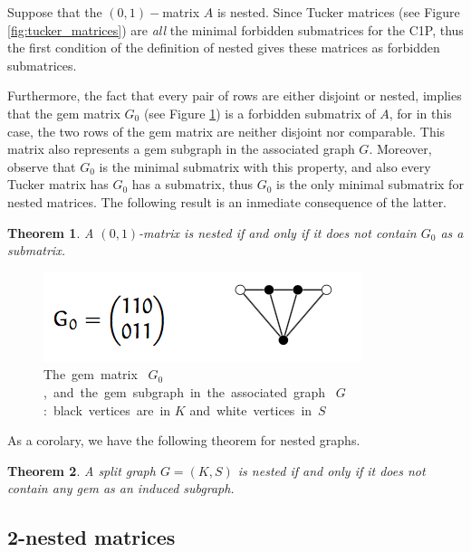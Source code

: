 \documentclass[a4paper,10pt]{report}
\theoremstyle{plain}
\newtheorem{teo}{Theorem}[chapter]
\theoremstyle{remark}
\theoremstyle{plain}
\begin{document}
\vspace{2mm}
Suppose that the $(0,1)-$matrix $A$ is nested. Since Tucker matrices (see Figure \ref{fig:tucker_matrices}) are \textit{all} the minimal forbidden submatrices for the C1P, 
thus the first condition of the definition of nested gives these matrices 
as forbidden submatrices.

Furthermore, the fact that every pair of rows are either disjoint or nested, implies that the gem matrix $G_0$ (see Figure \ref{fig:forb_nested}) is a forbidden submatrix of $A$,
for in this case, the two rows of the gem matrix are neither disjoint nor comparable.
This matrix also represents a gem subgraph in the associated graph $G$.
Moreover, observe that $G_0$ is the minimal submatrix with this property, and also every Tucker matrix has $G_0$ has a submatrix, thus $G_0$ is the only minimal submatrix for nested matrices.
The following result is an inmediate consequence of the latter.

\begin{teo}
	A $(0,1)$-matrix is nested if and only if it does not contain $G_0$ as a submatrix.
\end{teo}


\begin{figure}[h!]

	\centering  
	\includegraphics[scale=.6]{nested_forb.png}

	\caption{\mbox{The gem matrix } $G_0$ \mbox{, and the gem subgraph in the associated graph } $G$ \mbox{: black vertices are in} $K$ \mbox{and white vertices in }$S$}
	\label{fig:forb_nested}
\end{figure}

As a corolary, we have the following theorem for nested graphs.

\begin{teo}
	A split graph $G = (K,S)$ is nested if and only if it does not contain any gem as an induced subgraph.
\end{teo}

\subsection{2-nested matrices}
\end{document}
